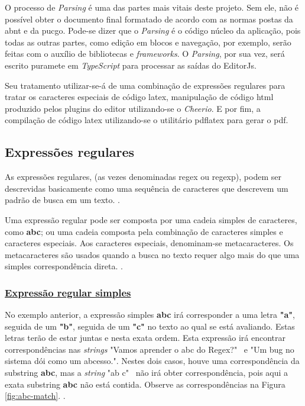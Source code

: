 O processo de \textit{Parsing} é uma das partes mais vitais deste projeto.
Sem ele, não é possível obter o documento final formatado de acordo
com as normas postas da
\acrshort{abnt}
e da
\acrshort{pucgo}.
Pode-se dizer que o \textit{Parsing} é o código núcleo da aplicação, pois todas
as outras partes, como edição em blocos e navegação, por exemplo,
serão feitas com o auxílio de bibliotecas e \textit{frameworks}. O \textit{Parsing},
por sua vez, será escrito puramete em \textit{TypeScript} para processar as
saídas do EditorJs.

Seu tratamento utilizar-se-á de uma combinação de expressões regulares
para tratar os caracteres especiais de código
\acrshort{latex},
manipulação de código
\acrshort{html}
produzido pelos plugins do editor utilizando-se o \textit{Cheerio}.
E por fim, a compilação de código
\acrshort{latex}
utilizando-se o utilitário pdflatex
para gerar o
\acrshort{pdf}.

\subsection{Expressões regulares}

As expressões regulares, (as vezes denominadas
\acrshort{regex}
ou
\acrshort{regexp}),
podem ser descrevidas basicamente como uma sequência de
caracteres que descrevem um padrão de busca em um texto.
\cite{dp6-regex}.

Uma expressão regular pode ser composta por uma cadeia simples de caracteres, como
\textbf{abc};
ou uma cadeia composta pela combinação de caracteres simples e caracteres especiais.
Aos caracteres especiais, denominam-se metacaracteres. Os metacaracteres são usados
quando a busca no texto requer algo mais do que uma simples correspondência direta.
\cite{mdn-regex}.

\subsubsection{\underline{Expressão regular simples}}

No exemplo anterior, a expressão simples
\textbf{abc}
irá corresponder a uma letra
\textbf{"a"},
seguida de um
\textbf{"b"},
seguida de um
\textbf{"c"}
no texto ao qual se está avaliando.
Estas letras terão de estar juntas e nesta exata ordem.
Esta expressão irá encontrar correspondências nas \textit{strings}
"Vamos aprender o abc do Regex?"~
e
"Um bug no sistema dói como um abcesso.".
Nestes dois casos, houve uma correspondência da substring
\textbf{abc},
mas a \textit{string}
"ab c"~
não irá obter correspondência, pois aqui a exata substring
\textbf{abc}
não está contida. Observe as correspondências na
Figura \ref{fig:abc-match}.
\cite{mdn-regex}.


